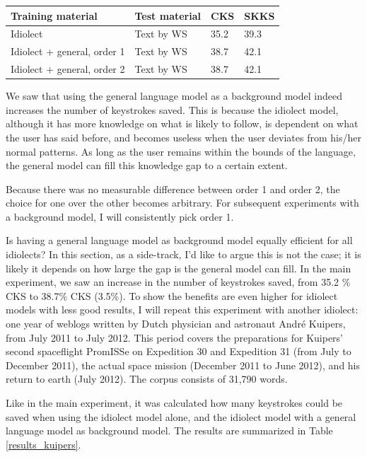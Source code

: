\documentclass[11pt]{article}
\let\originaltable\table
\let\endoriginaltable\endtable
\renewenvironment{table}[1][ht]{%
  \originaltable[#1]
  \centering}%
  {\endoriginaltable}
\begin{document}
\begin{table}[H]
\begin{tabular}{ll|ll} 
Training material&Test material&CKS&SKKS\\
\hline
Idiolect&Text by WS&35.2&39.3\\
Idiolect + general, order 1&Text by WS&38.7&42.1\\
Idiolect + general, order 2&Text by WS&38.7&42.1\\
\end{tabular} 
\caption{Percentage of keystrokes that can be saved when using the general model as background model} \label{results_background}
\end{table}

We saw that using the general language model as a background model indeed increases the number of keystrokes saved. This is because the idiolect model, although it has more knowledge on what is likely to follow, is dependent on what the user has said before, and becomes useless when the user deviates from his/her normal patterns. As long as the user remains within the bounds of the language, the general model can fill this knowledge gap to a certain extent.

Because there was no measurable difference between order 1 and order 2, the choice for one over the other becomes arbitrary. For subsequent experiments with a background model, I will consistently pick order 1.

Is having a general language model as background model equally efficient for all idiolects? In this section, as a side-track, I'd like to argue this is not the case; it is likely it depends on how large the gap is the general model can fill. In the main experiment, we saw an increase in the number of keystrokes saved, from 35.2 \% CKS to 38.7\% CKS (3.5\%). To show the benefits are even higher for idiolect models with less good results, I will repeat this experiment with another idiolect: one year of weblogs written by Dutch physician and astronaut Andr\'e Kuipers, from July 2011 to July 2012. This period covers the preparations for Kuipers' second spaceflight PromISSe on Expedition 30 and Expedition 31 (from July to December 2011), the actual space mission (December 2011 to June 2012), and his return to earth (July 2012). The corpus consists of 31,790 words. 

Like in the main experiment, it was calculated how many keystrokes could be saved when using the idiolect model alone, and the idiolect model with a general language model as background model. The results are summarized in Table \ref{results_kuipers}. 
\end{document}
